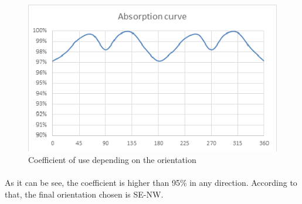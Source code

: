 		\begin{figure}[H]
			\centering
			\includegraphics[clip, trim=0cm 0cm 0cm 0cm, width=1\textwidth]{./images/WIND/GRAPH}
			\caption{Coefficient of use depending on the orientation} %
			\label{} %
		\end{figure}
		
		\paragraph{}As it can be see, the coefficient is higher than 95\% in any direction. According to that, the final
		orientation chosen is SE-NW.